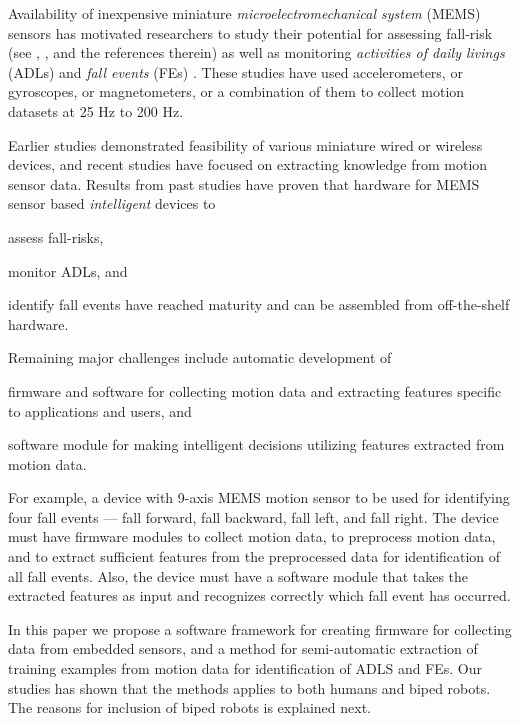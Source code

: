 \documentclass{IEEEtran}
\begin{document}
\par 
Availability of inexpensive miniature \emph{microelectromechanical system} (MEMS) sensors  has motivated researchers  to study their potential for assessing fall-risk  (see \cite{shanyReview2012}, \cite{howcroftReview2013}, and the references therein) as well as monitoring \emph{activities of daily livings} (ADLs) \cite{alvarezActivityAndFallRecognotion2015,BaoActivityrecognition2004,DernbachActivityAndFallDetectionPhone2012,krishnanActivityRecognition2014,kumarActivitAndFallDetection2013} and \emph{fall events} (FEs) \cite{baekFallDetection2013,baiFallDetectionPhone2013,DernbachActivityAndFallDetectionPhone2012,dumitracheFallDetection2013,kumarActivitAndFallDetection2013,leoneFallDetection2013,liangFallDetection2012,liFallDetection2009,moyaFallAndDamageDetection2015,ojetolaFallDetection2011,ShenFallDetectionPhone2015,steidlFallDetection2012,DoukasFallDetection2011,ErdoganFallDetection2014,JianFallDetection2015}. These studies have used  accelerometers,  or gyroscopes, or magnetometers, or  a combination of them to collect motion datasets at  25 Hz to 200 Hz.  
\par
Earlier studies demonstrated feasibility of various miniature wired or wireless devices, and recent studies have focused on extracting knowledge from motion sensor data.  Results from past studies have proven  that hardware for MEMS sensor based \emph{intelligent} devices to \begin{inparaenum} [($i$)] \item assess fall-risks, \item monitor ADLs, and \item identify fall events have reached maturity and can be assembled from off-the-shelf hardware. \end{inparaenum}  

\par
Remaining major challenges include automatic development of \begin{inparaenum}[($i$)] \item firmware and software for collecting motion data and  extracting features specific to applications and users, and \item software module for making intelligent decisions utilizing features extracted from motion data. \end{inparaenum}
For example, a device with 9-axis MEMS motion sensor to be used for identifying four fall events --- fall forward, fall backward, fall left, and fall right. The device must have firmware modules to collect motion data, to preprocess motion data, and to extract sufficient features from the preprocessed data for identification of all fall events. Also, the device must have a software module that takes the extracted features as input and recognizes correctly  which fall event has occurred.
\par
In this paper we  propose a software framework for creating firmware for collecting data from embedded sensors, and a method for semi-automatic extraction of training examples from motion data for identification of ADLS and FEs. Our studies has shown that the methods applies to both humans and biped robots. The reasons for inclusion of biped robots is explained next.
\end{document}
